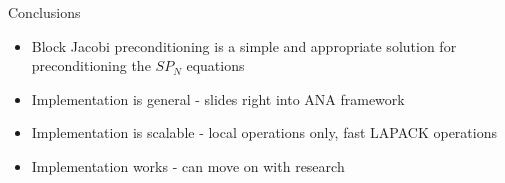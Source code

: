 \documentclass{beamer}
\begin{document}
\begin{frame}{Conclusions}

  \begin{itemize}
  \item Block Jacobi preconditioning is a simple and appropriate
    solution for preconditioning the $SP_N$ equations
  \item Implementation is general - slides right into ANA framework
  \item Implementation is scalable - local operations only, fast
    LAPACK operations
  \item Implementation works - can move on with research
  \end{itemize}

\end{frame}

\end{document}
